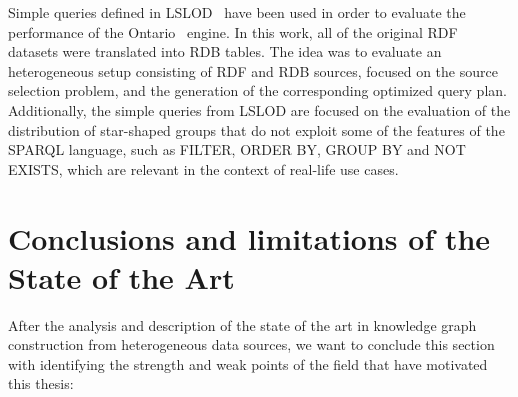 Simple queries defined in LSLOD~\citep{hasnain2017biofed} have been used in order to evaluate the performance of the Ontario~\citep{endris2019ontario} engine. In this work, all of the original RDF datasets were translated into RDB tables. The idea was to evaluate an heterogeneous setup consisting of RDF and RDB sources, focused on the source selection problem, and the generation of the corresponding optimized query plan. Additionally, the simple queries from LSLOD are focused on the evaluation of the distribution of star-shaped groups that do not exploit some of the features of the SPARQL language, such as FILTER, ORDER BY, GROUP BY and NOT EXISTS, which are relevant in the context of  real-life use cases.


\section{Conclusions and limitations of the State of the Art}
\label{sec:soa_conclusions}
After the analysis and description of the state of the art in knowledge graph construction from heterogeneous data sources, we want to conclude this section with identifying the strength and weak points of the field that have motivated this thesis:

